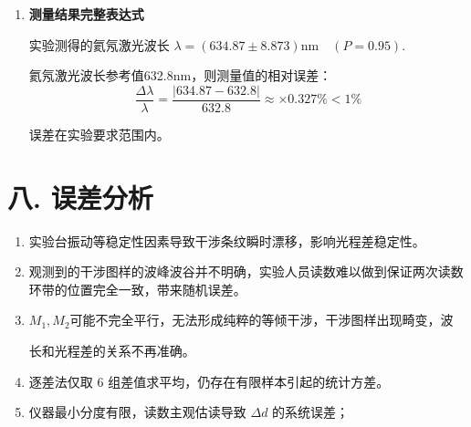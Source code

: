 \documentclass[12pt,a4paper]{article}
\begin{document}
\begin{enumerate}
	\textbf{B类不确定度：}

	仪器的最小刻度为

	$$\frac{\text{标尺最小分度}}{\text{粗调手轮刻度数}\times\text{细调手轮刻度数}} = \frac{1\mathrm{mm}}{100\times 100} = 100\mathrm{nm}$$
	\\
	则仪器的最大允差为：
	\[ 
	\Delta_{\text{仪}}\approx100\mathrm{nm}
	 \]
	 由于逐差法得到的$\Delta d$需要读数两次，其等效最大允差为：
	 \[ 
	 \Delta_{B} = \sqrt{\Delta_{\text{仪}}^2+\Delta_{\text{仪}}^2}=\sqrt{2}\Delta_{\text{仪}}
	 \]
	 测量仪器机构类似螺旋测微计，误差为正态分布，置信系数 $C = 3$，则 
	 $$u_{B}(\Delta D) = \dfrac{\sqrt{\Delta_B}}{C} = \dfrac{\sqrt{2} \times 100 \mathrm{nm}}{3} = 47.14\mathrm{nm}$$

	\textbf{各物理量在 $P = 0.95$ 时的合成不确定度：}
	
	$P=0.95$时：
	\begin{itemize}
		\item $n = 6$时的$t$因子$t_{0.95}=2.57$；
		\item 仪器误差视为正态分布，取$k_{0.95}=1.96$。
	\end{itemize}
	
	故：
	
	$$ u_{0.95}(\Delta d) = \sqrt{(t_{0.95}u_{A}(\Delta d))^{2}+(k_{0.95}u_{B}(\Delta d))^{2}} = \sqrt{(2.57\times 78.468)^2 + (1.96\times 47.14)^2} \approx 221.8\mathrm{nm}$$
	
	\textbf{波长的不确定度：}
	
	根据不确定度的传递公式：
	
	$$ u(\lambda) = \dfrac{2}{n}u(\Delta d) = \dfrac{2}{50}\times 221.8 = 8.873\mathrm{nm}$$
	
	\item \textbf{测量结果完整表达式}
	
	实验测得的氦氖激光波长 $\lambda = (634.87 \pm 8.873)\mathrm{nm}\quad (P=0.95)$.
	
	氦氖激光波长参考值632.8nm，则测量值的相对误差：
	$$ \frac{\Delta \lambda}{\lambda} = \frac{|634.87-632.8|}{632.8} \approx \times 0.327\% < 1\% $$

	误差在实验要求范围内。

	\end{enumerate}

	\section*{\textbf{八. 误差分析}}
	\begin{enumerate}
		\item 实验台振动等稳定性因素导致干涉条纹瞬时漂移，影响光程差稳定性。
		\item 观测到的干涉图样的波峰波谷并不明确，实验人员读数难以做到保证两次读数环带的位置完全一致，带来随机误差。
		\item $M_1,M_2$可能不完全平行，无法形成纯粹的等倾干涉，干涉图样出现畸变，波
		
		长和光程差的关系不再准确。
		\item 逐差法仅取 $6$ 组差值求平均，仍存在有限样本引起的统计方差。
		\item 仪器最小分度有限，读数主观估读导致 $\Delta d$ 的系统误差；
	\end{enumerate}
\end{document}
